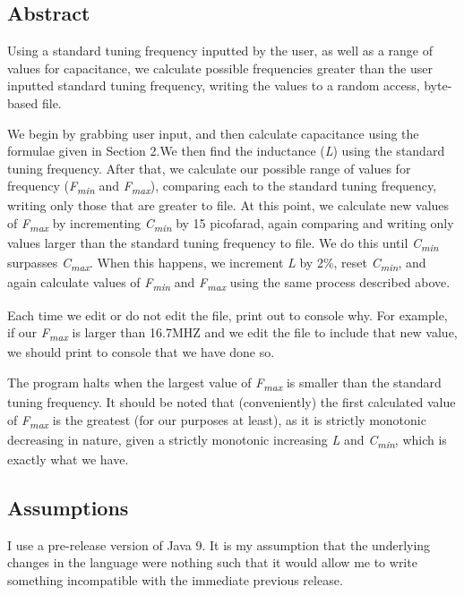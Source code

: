 \documentclass[12pt]{article}
\begin{document}
\subsection{Abstract}
Using a standard tuning frequency inputted by the user, as well as a range of values for capacitance, we calculate possible frequencies greater than the user inputted standard tuning frequency, writing the values to a random access, byte-based file.
\par %
We begin by grabbing user input, and then calculate capacitance using the formulae given in Section 2.We then find the inductance (\textit{L}) using the standard tuning frequency. After that, we calculate our possible range of values for frequency (\textit{F\textsubscript{min}} and \textit{F\textsubscript{max}}), comparing each to the standard tuning frequency, writing only those that are greater to file. At this point, we calculate new values of \textit{F\textsubscript{max}} by incrementing \textit{C\textsubscript{min}} by 15 picofarad, again comparing and writing only values larger than the standard tuning frequency to file. We do this until \textit{C\textsubscript{min}} surpasses \textit{C\textsubscript{max}}. When this happens, we increment \textit{L} by 2\%, reset \textit{C\textsubscript{min}}, and again calculate values of \textit{F\textsubscript{min}} and \textit{F\textsubscript{max}} using the same process described above.
\par %
Each time we edit or do not edit the file, print out to console why. For example, if our \textit{F\textsubscript{max}} is larger than 16.7MHZ and we edit the file to include that new value, we should print to console that we have done so.
\par %
The program halts when the largest value of \textit{F\textsubscript{max}} is smaller than the standard tuning frequency. It should be noted that (conveniently) the first calculated value of \textit{F\textsubscript{max}} is the greatest (for our purposes at least), as it is strictly monotonic decreasing in nature, given a strictly monotonic increasing \textit{L} and \textit{C\textsubscript{min}}, which is exactly what we have.
\subsection{Assumptions}
I use a pre-release version of Java 9. It is my assumption that the underlying changes in the language were nothing such that it would allow me to write something incompatible with the immediate previous release.
\end{document}
